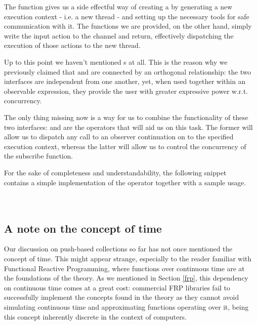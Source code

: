 The  function gives us a side effectful way of creating a  by generating a new execution context - i.e. a new thread - and setting up the necessary tools for safe communication with it. The  functions we are provided, on the other hand, simply write the input  action to the channel and return, effectively dispatching the execution of those actions to the new thread. 

Up to this point we haven't mentioned s at all. This is the reason why we previously claimed that  and  are connected by an orthogonal relationship: the two interfaces are independent from one another, yet, when used together within an observable expression, they provide the user with greater expressive power w.r.t. concurrency. 

The only thing missing now is a way for us to combine the functionality of these two interfaces:  and  are the operators that will aid us on this task. The former will allow us to dispatch any call to an observer continuation on to the specified execution context, whereas the latter will allow us to control the concurrency of the  subscribe function.

For the sake of completeness and understandability, the following snippet contains a simple implementation of the  operator together with a sample usage.\\

\\

\\


\subsection{A note on the concept of time}

Our discussion on push-based collections so far has not once mentioned the concept of time. This might appear strange, especially to the reader familiar with Functional Reactive Programming, where functions over continuous time are at the foundations of the theory. As we mentioned in Section \ref{frp}, this dependency on continuous time comes at a great cost: commercial FRP libraries fail to successfully implement the concepts found in the theory as they cannot avoid simulating continuous time and approximating functions operating over it, being this concept inherently discrete in the context of computers.

